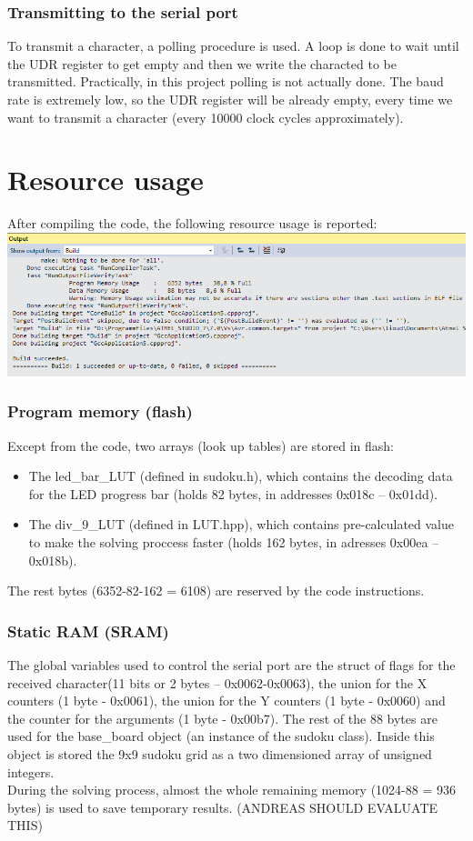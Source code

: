 \documentclass[12pt, a4]{article}
\begin{document}
\subsubsection*{Transmitting to the serial port}
To transmit a character, a polling procedure is used. A loop is done to wait until the UDR register to get empty and then we write the characted to be transmitted. Practically, in this project polling is not actually done. The baud rate is extremely low, so the UDR register will be already empty, every time we want to transmit a character (every 10000 clock cycles approximately).

\section*{Resource usage}
After compiling the code, the following resource usage is reported: \\
\includegraphics[width = \textwidth]{RESOURCES.png} 

\subsubsection*{Program memory (flash)}
Except from the code, two arrays (look up tables) are stored in flash: 
\begin{itemize}
\item The led\_bar\_LUT (defined in sudoku.h), which contains the decoding data for the LED progress bar (holds 82 bytes, in addresses 0x018c -- 0x01dd).
\item The div\_9\_LUT (defined in LUT.hpp), which contains pre-calculated value to make the solving proccess faster (holds 162 bytes, in adresses 0x00ea -- 0x018b).
\end{itemize}
The rest bytes (6352-82-162 = 6108) are reserved by the code instructions.

\subsubsection*{Static RAM (SRAM)}
The global variables used to control the serial port are the struct of flags for the received character(11 bits or 2 bytes -- 0x0062-0x0063), the union for the X counters (1 byte - 0x0061), the union for the Y counters (1 byte - 0x0060) and the counter for the arguments (1 byte - 0x00b7). The rest of the 88 bytes are used for the base\_board object (an instance of the sudoku class). Inside this object is stored the 9x9 sudoku grid as a two dimensioned array of unsigned integers. \\
During the solving process, almost the whole remaining memory (1024-88 = 936 bytes) is used to save temporary results. (ANDREAS SHOULD EVALUATE THIS)
\end{document}
